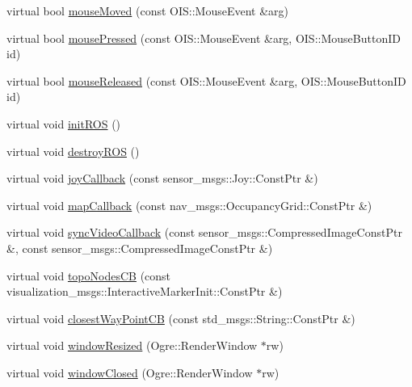\begin{DoxyCompactItemize}
virtual bool \hyperlink{classBaseApplication_abbb67365fb496300701dc7a6953936fe}{mouse\-Moved} (const \-O\-I\-S\-::\-Mouse\-Event \&arg)
\item 
virtual bool \hyperlink{classBaseApplication_a51b515984916eb7a1582499ee3309ac5}{mouse\-Pressed} (const \-O\-I\-S\-::\-Mouse\-Event \&arg, \-O\-I\-S\-::\-Mouse\-Button\-I\-D id)
\item 
virtual bool \hyperlink{classBaseApplication_ae347f583327e4ba1eb83f2df286c1d76}{mouse\-Released} (const \-O\-I\-S\-::\-Mouse\-Event \&arg, \-O\-I\-S\-::\-Mouse\-Button\-I\-D id)
\item 
virtual void \hyperlink{classBaseApplication_ab5a43497cbab09b76cbe7a4708b7134f}{init\-R\-O\-S} ()
\item 
virtual void \hyperlink{classBaseApplication_ab51382d0741e40aa647e20a3315f84e8}{destroy\-R\-O\-S} ()
\item 
virtual void \hyperlink{classBaseApplication_a420db6b234d9201c678aea3bf32779b5}{joy\-Callback} (const sensor\-\_\-msgs\-::\-Joy\-::\-Const\-Ptr \&)
\item 
virtual void \hyperlink{classBaseApplication_a1b61407bd716b52034e43a53d6409267}{map\-Callback} (const nav\-\_\-msgs\-::\-Occupancy\-Grid\-::\-Const\-Ptr \&)
\item 
virtual void \hyperlink{classBaseApplication_a63abfe637034ac7f620ad62c57a9b899}{sync\-Video\-Callback} (const sensor\-\_\-msgs\-::\-Compressed\-Image\-Const\-Ptr \&, const sensor\-\_\-msgs\-::\-Compressed\-Image\-Const\-Ptr \&)
\item 
virtual void \hyperlink{classBaseApplication_a89d5c75390a28253d2ad3755334d9558}{topo\-Nodes\-C\-B} (const visualization\-\_\-msgs\-::\-Interactive\-Marker\-Init\-::\-Const\-Ptr \&)
\item 
virtual void \hyperlink{classBaseApplication_ac12e0269774652b57894b58ffdbfc4d5}{closest\-Way\-Point\-C\-B} (const std\-\_\-msgs\-::\-String\-::\-Const\-Ptr \&)
\item 
virtual void \hyperlink{classBaseApplication_afe5d7ca9e0f0575b4046c1412e314e69}{window\-Resized} (\-Ogre\-::\-Render\-Window $\ast$rw)
\item 
virtual void \hyperlink{classBaseApplication_aa7130c376136aa3a9b121e2dee561aed}{window\-Closed} (\-Ogre\-::\-Render\-Window $\ast$rw)
\end{DoxyCompactItemize}
